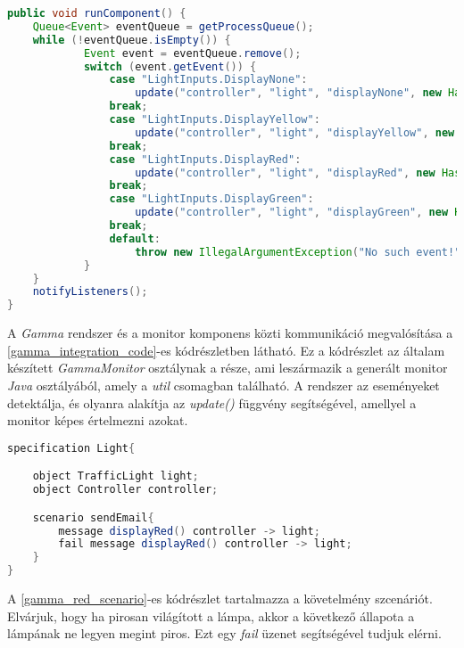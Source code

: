\begin{lstlisting}[language=java, frame=single, float=ht!, caption={Monitor komponenshez tartozó kódrészlet.},captionpos=b,label=gamma_integration_code]
public void runComponent() {
    Queue<Event> eventQueue = getProcessQueue();
    while (!eventQueue.isEmpty()) {
            Event event = eventQueue.remove();
            switch (event.getEvent()) {
                case "LightInputs.DisplayNone":
                    update("controller", "light", "displayNone", new HashMap<String, Object>());
                break;
                case "LightInputs.DisplayYellow":
                    update("controller", "light", "displayYellow", new HashMap<String, Object>());
                break;
                case "LightInputs.DisplayRed":
                    update("controller", "light", "displayRed", new HashMap<String, Object>());
                break;
                case "LightInputs.DisplayGreen":
                    update("controller", "light", "displayGreen", new HashMap<String, Object>());
                break;
                default:
                    throw new IllegalArgumentException("No such event!");
            }
    }
    notifyListeners();
}
\end{lstlisting}

A \textit{Gamma} rendszer és a monitor komponens közti kommunikáció megvalósítása a \ref{gamma_integration_code}-es kódrészletben látható.
Ez a kódrészlet az általam készített \textit{GammaMonitor} osztálynak a része, ami leszármazik a generált monitor \textit{Java} osztályából, amely a \textit{util} csomagban található.
A rendszer az eseményeket detektálja, és olyanra alakítja az \textit{update()} függvény segítségével, amellyel a monitor képes értelmezni azokat.

\begin{lstlisting}[language=java, frame=single, float=ht!, caption={Szcenárió szöveges leírása.},captionpos=b, label=gamma_red_scenario]
specification Light{

    object TrafficLight light;
    object Controller controller;

    scenario sendEmail{
        message displayRed() controller -> light;
        fail message displayRed() controller -> light;
    }
}
\end{lstlisting}

A \ref{gamma_red_scenario}-es kódrészlet tartalmazza a követelmény szcenáriót.
Elvárjuk, hogy ha pirosan világított a lámpa, akkor a következő állapota a lámpának ne legyen megint piros.
Ezt egy \textit{fail} üzenet segítségével tudjuk elérni.

